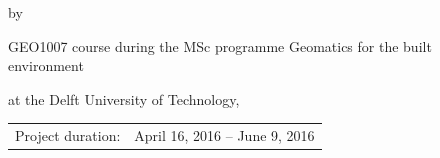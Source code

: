 \begin{titlepage}


\begin{center}


{\makeatletter
\largetitlestyle\fontsize{64}{94}\selectfont\@title
\makeatother}

{\makeatletter
\ifx\@subtitle\undefined\else
    \bigskip
   {\tudsffamily\fontsize{22}{32}\selectfont\@subtitle}    
\fi
\makeatother}

\bigskip
\bigskip

by

\bigskip
\bigskip

{\makeatletter
\largetitlestyle\fontsize{26}{26}\selectfont\@author
\makeatother}

\bigskip
\bigskip

{\fontsize{15}{0.2}\selectfont GEO1007 course during the MSc programme Geomatics for the built environment

at the Delft University of Technology,}

\vfill

\begin{tabular}{lll}
    Project duration: & \multicolumn{2}{l}{April 16, 2016 -- June 9, 2016} \\
\end{tabular}

\bigskip
\bigskip
\bigskip
\bigskip
\end{center}


\end{titlepage}

